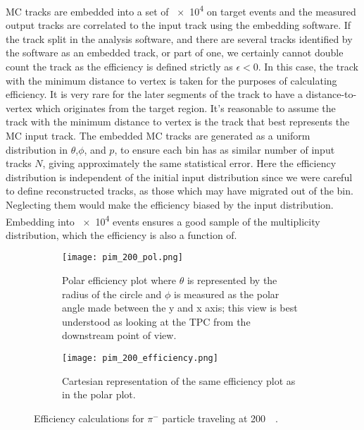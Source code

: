  MC tracks are embedded into a set of \num{e4} on target events and the measured output tracks are correlated to the input track using the embedding software. If the track split in the analysis software, and there are several tracks identified by the software as an embedded track, or part of one, we certainly cannot double count the track as the efficiency is  defined strictly as $\epsilon < 0$. In this case, the track with the minimum distance to vertex is taken for the purposes of calculating efficiency. It is very rare for the later segments of the track to have a distance-to-vertex which originates from the target region. It's reasonable to assume the track with the minimum distance to vertex is the track that best represents the MC input track. The embedded MC tracks are generated as a uniform distribution in $\theta$,$\phi$, and $p$, to ensure each bin has as similar number of input tracks $N$, giving approximately the same statistical error. Here the efficiency distribution is independent of the initial input distribution since we were careful to define reconstructed tracks, as those which may have migrated out of the bin. Neglecting them would make the efficiency biased by the input distribution. Embedding into \num{e4}  events ensures a good sample of the multiplicity distribution, which the efficiency is also a function of. 
 
\begin{figure}[!htb]
    \centering
    \begin{subfigure}[t]{0.49\textwidth}
        \centering
        \texttt{[image: pim\_200\_pol.png]}
        \caption{Polar efficiency plot where $\theta$ is represented by the radius of the circle and $\phi$ is measured as the polar angle made between the y and x axis; this view is  best understood as looking at the TPC from the downstream point of view.} \label{fig:pim_pol_eff_ex}
    \end{subfigure}
    \hfill
    \begin{subfigure}[t]{.49\textwidth}
        \centering
        \texttt{[image: pim\_200\_efficiency.png]} 
        \caption{Cartesian representation of the same efficiency plot  as in the polar plot.} \label{fig:pim_flat_eff_ex}
    \end{subfigure}
  
\caption{Efficiency calculations for $\pi^-$ particle traveling at \SI{200}{\mega\eVperc}.}
\label{fig:pim_eff_ex}
\end{figure}
 
 
 
